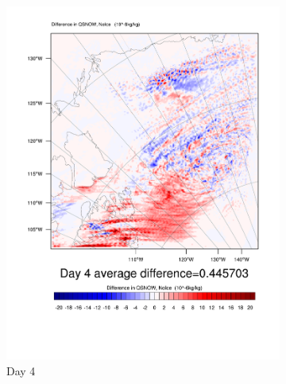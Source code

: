 \begin{figure}
	\begin{subfigure}{0.32\textwidth}
		\centering
		\includegraphics[width=\textwidth]{results/noice/diff_NoIce_qsnow_Day4.pdf}
		\caption{Day 4}
	\end{subfigure}
	\begin{subfigure}{0.32\textwidth}
		\centering

\end{subfigure}
\end{figure}
